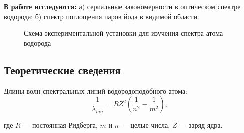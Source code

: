 \documentclass[12pt]{report}
\begin{document}
\section*{}

\textbf{В работе исследуются:} а) сериальные закономерности в оптическом спектре водорода; б) спектр поглощения паров йода в видимой области.

\begin{figure}[h]
    \centering
    \begin{floatrow}
        {\caption{Схема экспериментальной установки для изучения спектра атома водорода}}
    \end{floatrow}
\end{figure}


\subsection*{Теоретические сведения}

Длины волн спектральных линий водородоподобного атома:
\begin{equation}
\label{e1}
\frac{1}{\lambda_{mn}} = RZ^2\left( \frac{1}{n^2} - \frac{1}{m^2} \right),
\end{equation}

где $R$ --- постоянная Ридберга, $m$ и $n$ --- целые числа, $Z$ --- заряд ядра.
\end{document}

